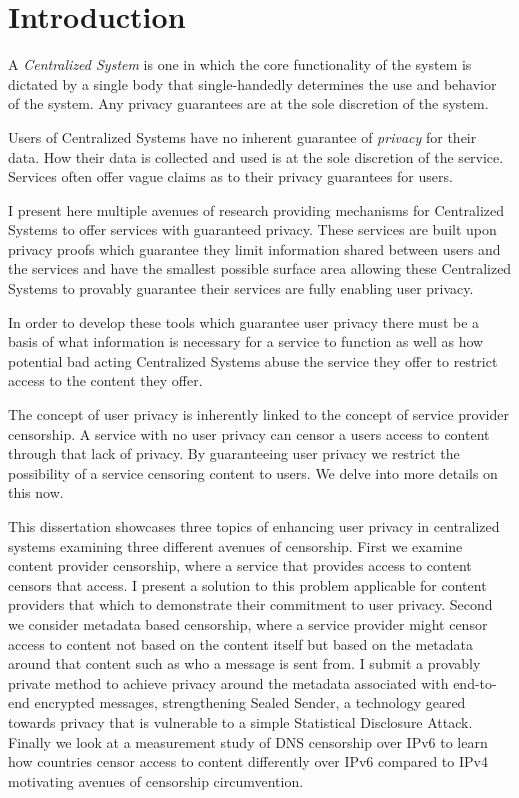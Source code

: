 \chapter{Introduction}

A \emph{Centralized System} is one in which the core functionality of the
system is dictated by a single body that single-handedly determines the use and
behavior of the system. Any privacy guarantees are at the sole discretion of the
system.

Users of Centralized Systems have no inherent guarantee of \emph{privacy} for 
their data. How their data is collected and used is at the sole discretion of
the service. Services often offer vague claims as to their privacy guarantees
for users.

I present here multiple avenues of research providing mechanisms for Centralized
Systems to offer services with guaranteed privacy. These services are built upon
privacy proofs which guarantee they limit information shared between users and
the services and have the smallest possible surface area allowing these
Centralized Systems to provably guarantee their services are fully enabling user
privacy.

In order to develop these tools which guarantee user privacy there must be a
basis of what information is necessary for a service to function as well as how
potential bad acting Centralized Systems abuse the service they offer to
restrict access to the content they offer.

The concept of user privacy is inherently linked to the concept of service
provider censorship. A service with no user privacy can censor a users access to
content through that lack of privacy. By guaranteeing user privacy we restrict
the possibility of a service censoring content to users. We delve into more
details on this now.

This dissertation showcases three topics of enhancing user privacy in
centralized systems examining three different avenues of censorship. First we
examine content provider censorship, where a service that provides access to
content censors that access. I present a solution to this problem applicable for
content providers that which to demonstrate their commitment to user privacy.
Second we consider metadata based censorship, where a service provider might
censor access to content not based on the content itself but based on the
metadata around that content such as who a message is sent from. I submit a
provably private method to achieve privacy around the metadata associated with
end-to-end encrypted messages, strengthening Sealed Sender, a technology geared
towards privacy that is vulnerable to a simple Statistical Disclosure Attack.
Finally we look at a measurement study of DNS censorship over IPv6 to learn how
countries censor access to content differently over IPv6 compared to IPv4
motivating avenues of censorship circumvention.

